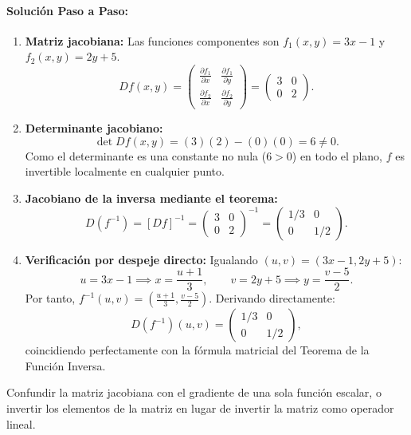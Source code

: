 \documentclass[11pt,a4paper]{article}
\begin{document}
\paragraph{Solución Paso a Paso:}\par
\begin{enumerate}[label=\textbf{\arabic*.}]
\item \textbf{Matriz jacobiana:}
Las funciones componentes son $f_1(x,y) = 3x - 1$ y $f_2(x,y) = 2y + 5$.
\[ Df(x,y) = \begin{pmatrix} \frac{\partial f_1}{\partial x} & \frac{\partial f_1}{\partial y} \\[4pt] \frac{\partial f_2}{\partial x} & \frac{\partial f_2}{\partial y} \end{pmatrix} = \begin{pmatrix} 3 & 0 \\[4pt] 0 & 2 \end{pmatrix}. \]
\item \textbf{Determinante jacobiano:}
\[ \det Df(x,y) = (3)(2) - (0)(0) = 6 \neq 0. \]
Como el determinante es una constante no nula ($6 > 0$) en todo el plano, $f$ es invertible localmente en cualquier punto.
\item \textbf{Jacobiano de la inversa mediante el teorema:}
\[ D(f^{-1}) = [Df]^{-1} = \begin{pmatrix} 3 & 0 \\[4pt] 0 & 2 \end{pmatrix}^{-1} = \begin{pmatrix} 1/3 & 0 \\[4pt] 0 & 1/2 \end{pmatrix}. \]
\item \textbf{Verificación por despeje directo:}
Igualando $(u,v) = (3x - 1, 2y + 5)$:
\[ u = 3x - 1 \implies x = \frac{u+1}{3}, \qquad v = 2y + 5 \implies y = \frac{v-5}{2}. \]
Por tanto, $f^{-1}(u,v) = \left( \frac{u+1}{3}, \frac{v-5}{2} \right)$. Derivando directamente:
\[ D(f^{-1})(u,v) = \begin{pmatrix} 1/3 & 0 \\[4pt] 0 & 1/2 \end{pmatrix}, \]
coincidiendo perfectamente con la fórmula matricial del Teorema de la Función Inversa.
\end{enumerate}

\begin{trapbox}
Confundir la matriz jacobiana con el gradiente de una sola función escalar, o invertir los elementos de la matriz en lugar de invertir la matriz como operador lineal.
\end{trapbox}
\end{document}
